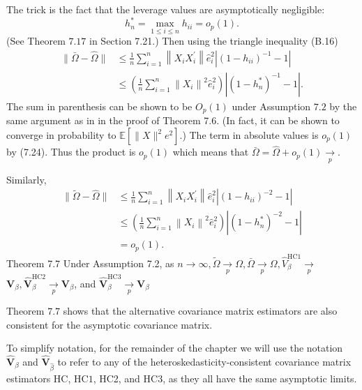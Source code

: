 \documentclass[10pt]{article}
\begin{document}
The trick is the fact that the leverage values are asymptotically negligible:
$$
h_{n}^{*}=\max _{1 \leq i \leq n} h_{i i}=o_{p}(1) .
$$
(See Theorem $7.17$ in Section 7.21.) Then using the triangle inequality (B.16)
$$
\begin{aligned}
\|\bar{\Omega}-\widehat{\Omega}\| & \leq \frac{1}{n} \sum_{i=1}^{n}\left\|X_{i} X_{i}^{\prime}\right\| \widehat{e}_{i}^{2}\left|\left(1-h_{i i}\right)^{-1}-1\right| \\
& \leq\left(\frac{1}{n} \sum_{i=1}^{n}\left\|X_{i}\right\|^{2} \widehat{e}_{i}^{2}\right)\left|\left(1-h_{n}^{*}\right)^{-1}-1\right| .
\end{aligned}
$$
The sum in parenthesis can be shown to be $O_{p}(1)$ under Assumption $7.2$ by the same argument as in in the proof of Theorem 7.6. (In fact, it can be shown to converge in probability to $\mathbb{E}\left[\|X\|^{2} e^{2}\right]$.) The term in absolute values is $o_{p}(1)$ by (7.24). Thus the product is $o_{p}(1)$ which means that $\bar{\Omega}=\widehat{\Omega}+o_{p}(1) \underset{p}{\longrightarrow}$.

Similarly,
$$
\begin{aligned}
\|\widetilde{\Omega}-\widehat{\Omega}\| & \leq \frac{1}{n} \sum_{i=1}^{n}\left\|X_{i} X_{i}^{\prime}\right\| \widehat{e}_{i}^{2}\left|\left(1-h_{i i}\right)^{-2}-1\right| \\
& \leq\left(\frac{1}{n} \sum_{i=1}^{n}\left\|X_{i}\right\|^{2} \widehat{e}_{i}^{2}\right)\left|\left(1-h_{n}^{*}\right)^{-2}-1\right| \\
&=o_{p}(1) .
\end{aligned}
$$
Theorem 7.7 Under Assumption 7.2, as $n \rightarrow \infty, \widetilde{\Omega} \underset{p}{\longrightarrow} \Omega, \bar{\Omega} \underset{p}{\longrightarrow} \Omega, \widehat{V}_{\beta}^{\mathrm{HC1}} \underset{p}{\longrightarrow}$ $\boldsymbol{V}_{\beta}, \widehat{\boldsymbol{V}}_{\beta}^{\mathrm{HC} 2} \underset{p}{\longrightarrow} \boldsymbol{V}_{\beta}$, and $\widehat{\boldsymbol{V}}_{\beta}^{\mathrm{HC} 3} \underset{p}{\longrightarrow} \boldsymbol{V}_{\beta}$

Theorem $7.7$ shows that the alternative covariance matrix estimators are also consistent for the asymptotic covariance matrix.

To simplify notation, for the remainder of the chapter we will use the notation $\widehat{\boldsymbol{V}}_{\beta}$ and $\widehat{\boldsymbol{V}}_{\widehat{\beta}}$ to refer to any of the heteroskedasticity-consistent covariance matrix estimators $\mathrm{HC}$, $\mathrm{HC} 1$, HC2, and $\mathrm{HC3}$, as they all have the same asymptotic limits.
\end{document}
